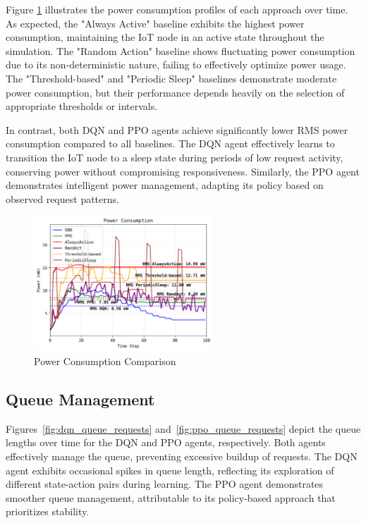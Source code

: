 \documentclass[11pt,a4paper]{article}
\begin{document}
Figure \ref{fig:power_comparison} illustrates the power consumption profiles of each approach over time. As expected, the "Always Active" baseline exhibits the highest power consumption, maintaining the IoT node in an active state throughout the simulation. The "Random Action" baseline shows fluctuating power consumption due to its non-deterministic nature, failing to effectively optimize power usage. The "Threshold-based" and "Periodic Sleep" baselines demonstrate moderate power consumption, but their performance depends heavily on the selection of appropriate thresholds or intervals.

In contrast, both DQN and PPO agents achieve significantly lower RMS power consumption compared to all baselines. The DQN agent effectively learns to transition the IoT node to a sleep state during periods of low request activity, conserving power without compromising responsiveness. Similarly, the PPO agent demonstrates intelligent power management, adapting its policy based on observed request patterns.

\begin{figure}[t]
    \centering
    \includegraphics[width=0.6\textwidth]{figs/power_comparison.png}
    \caption{Power Consumption Comparison}
    \label{fig:power_comparison}
\end{figure}

\subsection{Queue Management}

Figures~\ref{fig:dqn_queue_requests} and~\ref{fig:ppo_queue_requests} depict the queue lengths over time for the DQN and PPO agents, respectively. Both agents effectively manage the queue, preventing excessive buildup of requests. The DQN agent exhibits occasional spikes in queue length, reflecting its exploration of different state-action pairs during learning. The PPO agent demonstrates smoother queue management, attributable to its policy-based approach that prioritizes stability.
\end{document}
